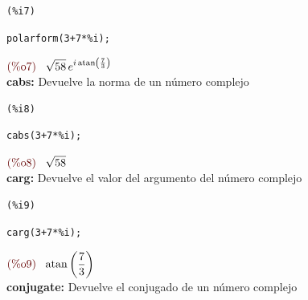 \documentclass[10pt,a4paper]{book}
\begin{document}
\noindent
\begin{minipage}[t]{8ex}{\color{red}\bf
\begin{verbatim}
(%i7) 
\end{verbatim}}
\end{minipage}
\begin{minipage}[t]{\textwidth}{\color{blue}
\begin{verbatim}
polarform(3+7*%i);
\end{verbatim}}
\end{minipage}
\begin{math}\displaystyle
\parbox{8ex}{\color{labelcolor}(\%o7) }
\sqrt{58}\,{e}^{i\,\mathrm{atan}\left( \frac{7}{3}\right) }
\end{math}
\\ \textbf{cabs: } Devuelve la norma de un número complejo

\noindent
\begin{minipage}[t]{8ex}{\color{red}\bf
\begin{verbatim}
(%i8) 
\end{verbatim}}
\end{minipage}
\begin{minipage}[t]{\textwidth}{\color{blue}
\begin{verbatim}
cabs(3+7*%i);
\end{verbatim}}
\end{minipage}
\begin{math}\displaystyle
\parbox{8ex}{\color{labelcolor}(\%o8) }
\sqrt{58}
\end{math}
\\ \textbf{carg: } Devuelve el valor del argumento del número complejo \\

\noindent
\begin{minipage}[t]{8ex}{\color{red}\bf
\begin{verbatim}
(%i9) 
\end{verbatim}}
\end{minipage}
\begin{minipage}[t]{\textwidth}{\color{blue}
\begin{verbatim}
carg(3+7*%i);
\end{verbatim}}
\end{minipage}
\begin{math}\displaystyle
\parbox{8ex}{\color{labelcolor}(\%o9) }
\mathrm{atan}\left( \frac{7}{3}\right) 
\end{math}
\\ \textbf{conjugate: } Devuelve el conjugado de un número complejo
\end{document}
